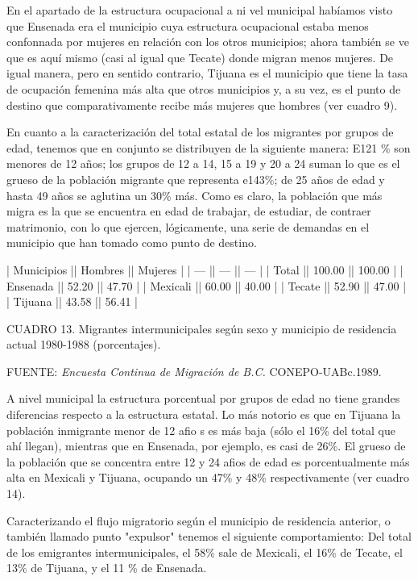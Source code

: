 \documentclass{article}
\begin{document}
En el apartado de la estructura ocupacional a ni vel municipal habíamos visto que Ensenada era el municipio cuya estructura ocupacional estaba menos confonnada por mujeres en relación con los otros municipios; ahora también se ve que es aquí mismo (casi al igual que Tecate) donde migran menos mujeres. De igual manera, pero en sentido contrario, Tijuana es el municipio que tiene la tasa de ocupación femenina más alta que otros municipios y, a su vez, es el punto de destino que comparativamente recibe más mujeres que hombres (ver cuadro 9).

En cuanto a la caracterización del total estatal de los migrantes por grupos de edad, tenemos que en conjunto se distribuyen de la siguiente manera: E121 \% son menores de 12 años; los grupos de 12 a 14, 15 a 19 y 20 a 24 suman lo que es el grueso de la población migrante que representa e143\%; de 25 años de edad y hasta 49 años se aglutina un 30\% más. Como es claro, la población que más migra es la que se encuentra en edad de trabajar, de estudiar, de contraer matrimonio, con lo que ejercen, lógicamente, una serie de demandas en el municipio que han tomado como punto de destino.

| Municipios || Hombres || Mujeres |
| ---        || ---     || ---     |
| Total      || 100.00  || 100.00  |
| Ensenada   || 52.20   || 47.70   |
| Mexicali   || 60.00   || 40.00   |
| Tecate     || 52.90   || 47.00   |
| Tijuana    || 43.58   || 56.41   |

CUADRO 13. Migrantes intermunicipales según sexo y municipio de residencia actual 1980-1988 (porcentajes).

FUENTE: \textit{Encuesta Continua de Migración de B.C.} CONEPO-UABc.1989.

A nivel municipal la estructura porcentual por grupos de edad no tiene grandes diferencias respecto a la estructura estatal. Lo más notorio es que en Tijuana la población inmigrante menor de 12 afio s es más baja (sólo el 16\% del total que ahí llegan), mientras que en Ensenada, por ejemplo, es casi de 26\%. El grueso de la población que se concentra entre 12 y 24 afios de edad es porcentualmente más alta en Mexicali y Tijuana, ocupando un 47\% y 48\% respectivamente (ver cuadro 14).

Caracterizando el flujo migratorio según el municipio de residencia anterior, o también llamado punto "expulsor" tenemos el siguiente comportamiento: Del total de los emigrantes intermunicipales, el 58\% sale de Mexicali, el 16\% de Tecate, el 13\% de Tijuana, y el 11 \% de Ensenada.
\end{document}
